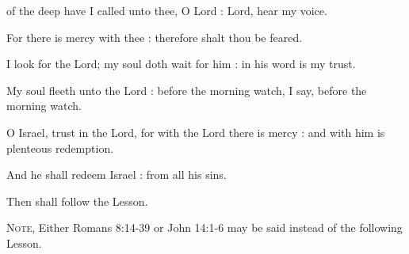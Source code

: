  of the deep have I called unto thee, O Lord : Lord, hear my voice.\par
{}
For there is mercy with thee : therefore shalt thou be feared.\par
{}I look for the Lord; my soul doth wait for him : in his word is my trust.\par
{}My soul fleeth unto the Lord : before the morning watch, I say, before the morning watch.\par
{}O Israel, trust in the Lord, for with the Lord there is mercy : and with him is plenteous redemption.\par
{}And he shall redeem Israel : from all his sins.\par

\begin{rubric}
	Then shall follow the Lesson.\par
	\textsc{Note,} Either Romans 8:14-39 or John 14:1-6 may be said instead of the following Lesson.
\end{rubric}

